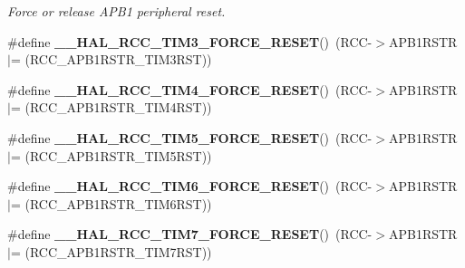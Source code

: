 \begin{DoxyCompactItemize}
\begin{DoxyCompactList}\small\item\em Force or release A\+P\+B1 peripheral reset. \end{DoxyCompactList}\item 
\mbox{\label{group___r_c_c_ex___force___release___peripheral___reset_ga80ff127f3c25bde58ee5c1f224e2dca4}} 
\#define {\bfseries \+\_\+\+\_\+\+H\+A\+L\+\_\+\+R\+C\+C\+\_\+\+T\+I\+M3\+\_\+\+F\+O\+R\+C\+E\+\_\+\+R\+E\+S\+ET}()~(R\+CC-\/$>$A\+P\+B1\+R\+S\+TR $\vert$= (R\+C\+C\+\_\+\+A\+P\+B1\+R\+S\+T\+R\+\_\+\+T\+I\+M3\+R\+ST))
\item 
\mbox{\label{group___r_c_c_ex___force___release___peripheral___reset_ga16ff4de009e6cf02e8bfff068866837a}} 
\#define {\bfseries \+\_\+\+\_\+\+H\+A\+L\+\_\+\+R\+C\+C\+\_\+\+T\+I\+M4\+\_\+\+F\+O\+R\+C\+E\+\_\+\+R\+E\+S\+ET}()~(R\+CC-\/$>$A\+P\+B1\+R\+S\+TR $\vert$= (R\+C\+C\+\_\+\+A\+P\+B1\+R\+S\+T\+R\+\_\+\+T\+I\+M4\+R\+ST))
\item 
\mbox{\label{group___r_c_c_ex___force___release___peripheral___reset_ga20ca12317dd14485d79902863aad063b}} 
\#define {\bfseries \+\_\+\+\_\+\+H\+A\+L\+\_\+\+R\+C\+C\+\_\+\+T\+I\+M5\+\_\+\+F\+O\+R\+C\+E\+\_\+\+R\+E\+S\+ET}()~(R\+CC-\/$>$A\+P\+B1\+R\+S\+TR $\vert$= (R\+C\+C\+\_\+\+A\+P\+B1\+R\+S\+T\+R\+\_\+\+T\+I\+M5\+R\+ST))
\item 
\mbox{\label{group___r_c_c_ex___force___release___peripheral___reset_ga3446c3ea4d5e101b591fcb0222d0fb10}} 
\#define {\bfseries \+\_\+\+\_\+\+H\+A\+L\+\_\+\+R\+C\+C\+\_\+\+T\+I\+M6\+\_\+\+F\+O\+R\+C\+E\+\_\+\+R\+E\+S\+ET}()~(R\+CC-\/$>$A\+P\+B1\+R\+S\+TR $\vert$= (R\+C\+C\+\_\+\+A\+P\+B1\+R\+S\+T\+R\+\_\+\+T\+I\+M6\+R\+ST))
\item 
\mbox{\label{group___r_c_c_ex___force___release___peripheral___reset_ga350e60b0e21e094ff1624e1da9855e65}} 
\#define {\bfseries \+\_\+\+\_\+\+H\+A\+L\+\_\+\+R\+C\+C\+\_\+\+T\+I\+M7\+\_\+\+F\+O\+R\+C\+E\+\_\+\+R\+E\+S\+ET}()~(R\+CC-\/$>$A\+P\+B1\+R\+S\+TR $\vert$= (R\+C\+C\+\_\+\+A\+P\+B1\+R\+S\+T\+R\+\_\+\+T\+I\+M7\+R\+ST))

\end{DoxyCompactItemize}
